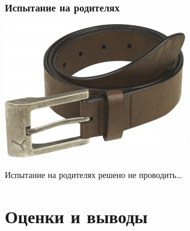 \begin{frame}
    \frametitle{Испытание на родителях}
    
    \begin{center}
        \includegraphics[width=.6\textwidth]{fig/belt}
    \end{center}
    
    Испытание на родителях решено не проводить\ldots
\end{frame}


\section{Оценки и выводы}

